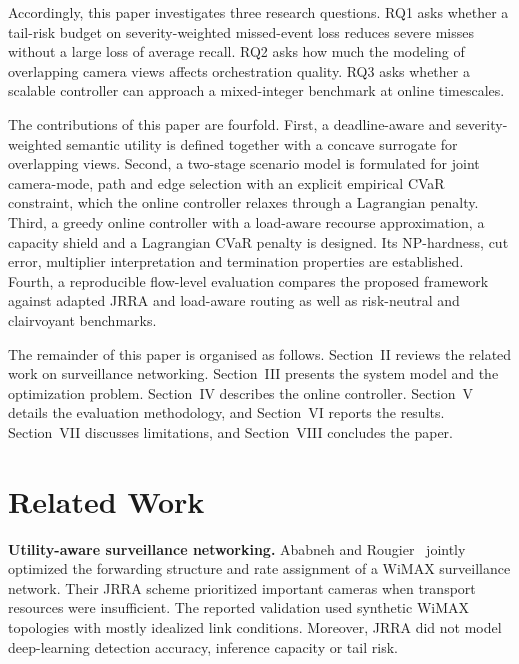 \documentclass[letterpaper,journal]{IEEEtran}
\begin{document}
Accordingly, this paper investigates three research questions. RQ1 asks whether a tail-risk budget on severity-weighted missed-event loss reduces severe misses without a large loss of average recall. RQ2 asks how much the modeling of overlapping camera views affects orchestration quality. RQ3 asks whether a scalable controller can approach a mixed-integer benchmark at online timescales.

The contributions of this paper are fourfold. First, a deadline-aware and severity-weighted semantic utility is defined together with a concave surrogate for overlapping views. Second, a two-stage scenario model is formulated for joint camera-mode, path and edge selection with an explicit empirical CVaR constraint, which the online controller relaxes through a Lagrangian penalty. Third, a greedy online controller with a load-aware recourse approximation, a capacity shield and a Lagrangian CVaR penalty is designed. Its NP-hardness, cut error, multiplier interpretation and termination properties are established. Fourth, a reproducible flow-level evaluation compares the proposed framework against adapted JRRA and load-aware routing as well as risk-neutral and clairvoyant benchmarks.

The remainder of this paper is organised as follows. Section~II reviews the related work on surveillance networking. Section~III presents the system model and the optimization problem. Section~IV describes the online controller. Section~V details the evaluation methodology, and Section~VI reports the results. Section~VII discusses limitations, and Section~VIII concludes the paper.

\section{Related Work}
\textbf{Utility-aware surveillance networking.} Ababneh and Rougier~\cite{ababneh2012} jointly optimized the forwarding structure and rate assignment of a WiMAX surveillance network. Their JRRA scheme prioritized important cameras when transport resources were insufficient. The reported validation used synthetic WiMAX topologies with mostly idealized link conditions. Moreover, JRRA did not model deep-learning detection accuracy, inference capacity or tail risk.
\end{document}
